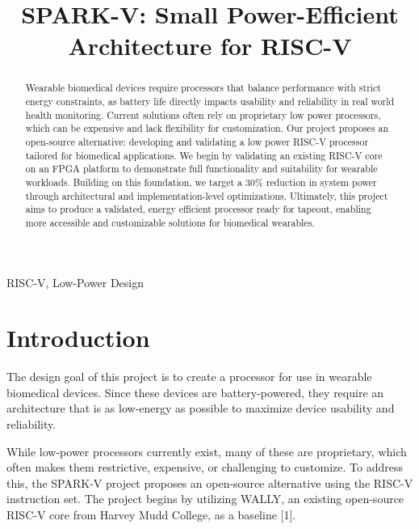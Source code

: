 \documentclass[conference]{IEEEtran}
\begin{document}
\title{SPARK-V: Small Power-Efficient Architecture for RISC-V}


\author{
}

\maketitle

\begin{abstract}
Wearable biomedical devices require processors that balance performance with strict energy constraints, as battery life directly impacts usability and reliability in real world health monitoring. Current solutions often rely on proprietary low power processors, which can be expensive and lack flexibility for customization. Our project proposes an open-source alternative: developing and validating a low power RISC-V processor tailored for biomedical applications. We begin by validating an existing RISC-V core on an FPGA platform to demonstrate full functionality and suitability for wearable workloads. Building on this foundation, we target a 30\% reduction in system power through architectural and implementation-level optimizations. Ultimately, this project aims to produce a validated, energy efficient processor ready for tapeout, enabling more accessible and customizable solutions for biomedical wearables.
\end{abstract}

\begin{IEEEkeywords}
RISC-V, Low-Power Design
\end{IEEEkeywords}

\section{Introduction}
The design goal of this project is to create a processor for use in wearable biomedical devices. Since these devices are battery-powered, they require an architecture that is as low-energy as possible to maximize device usability and reliability.

While low-power processors currently exist, many of these are proprietary, which often makes them restrictive, expensive, or challenging to customize. To address this, the SPARK-V project proposes an open-source alternative using the RISC-V instruction set. The project begins by utilizing WALLY, an existing open-source RISC-V core from Harvey Mudd College, as a baseline [1].
\end{document}
